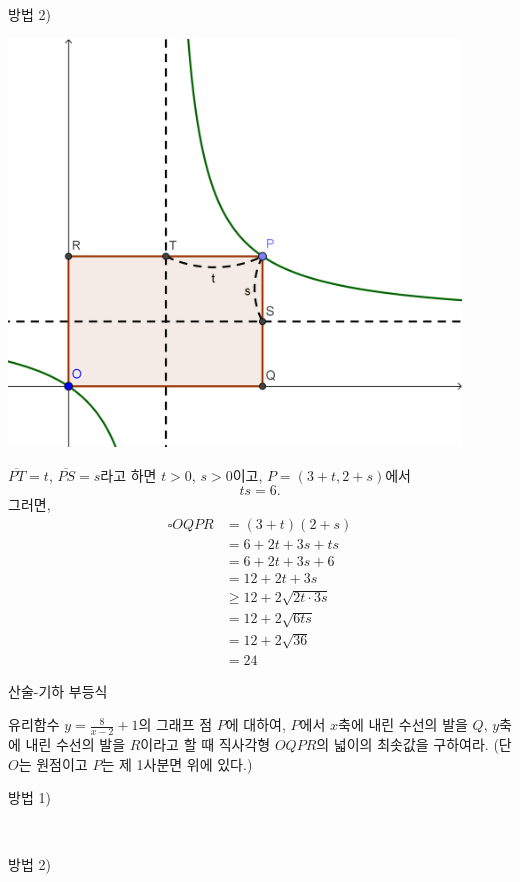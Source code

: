 \documentclass[a4paper]{oblivoir}
\begin{document}
\begin{minipage}{0.45\textwidth}
방법 2)
\begin{center}
\includegraphics[width=0.9\textwidth]{2}
\end{center}

\(\overline{PT}=t\), \(\overline{PS}=s\)라고 하면 \(t>0\), \(s>0\)이고, \(P=(3+t,2+s)\)에서
\[ts=6.\]
그러면,
\begin{align*}
\square OQPR
&=(3+t)(2+s)\\
&=6+2t+3s+ts\\
&=6+2t+3s+6\\
&=12+2t+3s\\
&\ge12+2\sqrt{2t\cdot3s}\\
&=12+2\sqrt{6ts}\\
&=12+2\sqrt{36}\\
&=24
\end{align*}
\hspace{130pt}
\end{minipage}

\newpage
\begin{center}
 산술-기하 부등식
\end{center}

\bigskip
\begin{mdframed}[leftmargin=.2\textwidth,rightmargin=.2\textwidth]
\begin{spacing}{1.7}
유리함수 \(\displaystyle y=\frac8{x-2}+1\)의 그래프 점 \(P\)에 대하여, \(P\)에서 \(x\)축에 내린 수선의 발을 \(Q\), \(y\)축에 내린 수선의 발을 \(R\)이라고 할 때 직사각형 \(OQPR\)의 넓이의 최솟값을 구하여라.
(단 \(O\)는 원점이고 \(P\)는 제 1사분면 위에 있다.)
\end{spacing}
\vspace{0pt}
\end{mdframed}
\bigskip\bigskip

%
\begin{minipage}{0.45\textwidth}
\begin{mdframed}
방법 1)
\vspace{0.7\textheight}
\end{mdframed}
\end{minipage}
~
\begin{minipage}{0.45\textwidth}
\begin{mdframed}
방법 2)
\vspace{0.7\textheight}
\end{mdframed}
\end{minipage}
\end{document}

